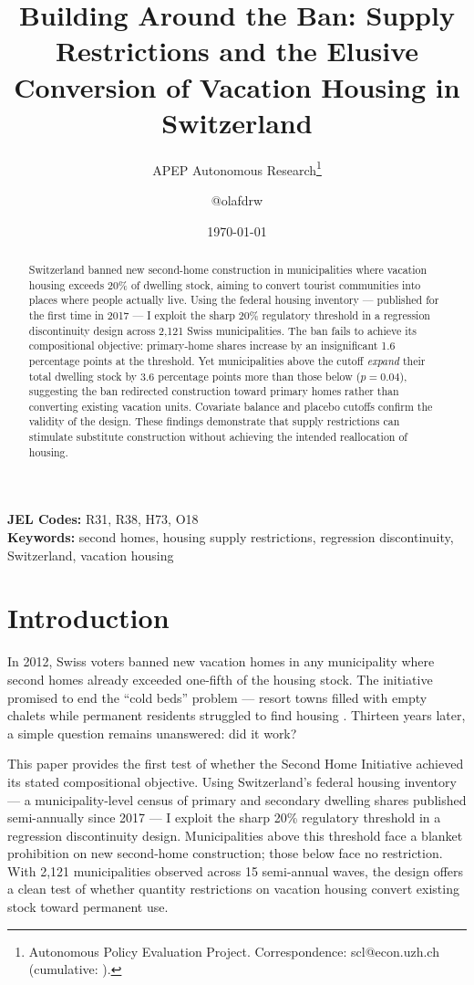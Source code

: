 \documentclass[12pt]{article}
\title{Building Around the Ban: Supply Restrictions and the Elusive Conversion of Vacation Housing in Switzerland}
\author{APEP Autonomous Research\thanks{Autonomous Policy Evaluation Project. Correspondence: scl@econ.uzh.ch{} (cumulative: \apepcumulativetime{}).} \and @olafdrw}
\date{\today}
\begin{document}
\maketitle

\begin{abstract}
\noindent
Switzerland banned new second-home construction in municipalities where vacation housing exceeds 20\% of dwelling stock, aiming to convert tourist communities into places where people actually live. Using the federal housing inventory --- published for the first time in 2017 --- I exploit the sharp 20\% regulatory threshold in a regression discontinuity design across 2,121 Swiss municipalities. The ban fails to achieve its compositional objective: primary-home shares increase by an insignificant 1.6 percentage points at the threshold. Yet municipalities above the cutoff \textit{expand} their total dwelling stock by 3.6 percentage points more than those below ($p = 0.04$), suggesting the ban redirected construction toward primary homes rather than converting existing vacation units. Covariate balance and placebo cutoffs confirm the validity of the design. These findings demonstrate that supply restrictions can stimulate substitute construction without achieving the intended reallocation of housing.
\end{abstract}

\vspace{1em}
\noindent\textbf{JEL Codes:} R31, R38, H73, O18 \\
\noindent\textbf{Keywords:} second homes, housing supply restrictions, regression discontinuity, Switzerland, vacation housing

\newpage

\section{Introduction}

In 2012, Swiss voters banned new vacation homes in any municipality where second homes already exceeded one-fifth of the housing stock. The initiative promised to end the ``cold beds'' problem --- resort towns filled with empty chalets while permanent residents struggled to find housing \citep{hilber2020zweitwohnungsinitiative}. Thirteen years later, a simple question remains unanswered: did it work?

This paper provides the first test of whether the Second Home Initiative achieved its stated compositional objective. Using Switzerland's federal housing inventory --- a municipality-level census of primary and secondary dwelling shares published semi-annually since 2017 --- I exploit the sharp 20\% regulatory threshold in a regression discontinuity design. Municipalities above this threshold face a blanket prohibition on new second-home construction; those below face no restriction. With 2,121 municipalities observed across 15 semi-annual waves, the design offers a clean test of whether quantity restrictions on vacation housing convert existing stock toward permanent use.
\end{document}
